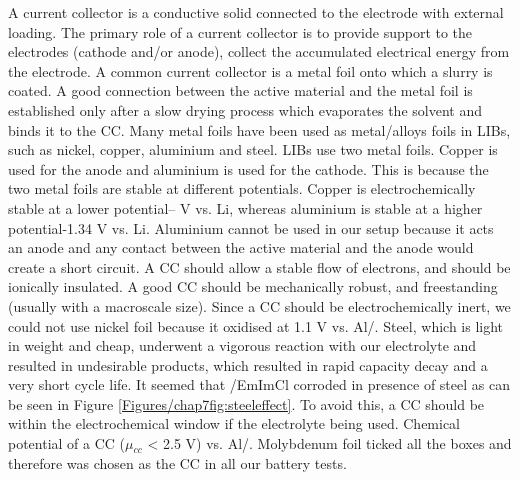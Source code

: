 A current collector is a conductive solid connected to the electrode with external loading. The primary role of a current collector is to provide support to the electrodes (cathode and/or anode), collect the accumulated electrical energy from the electrode. A common current collector is a metal foil onto which a slurry is coated. A good connection between the active material and the metal foil is established only after a slow drying process which evaporates the solvent and binds it to the CC. Many metal foils have been used as metal/alloys foils in LIBs, such as nickel, copper, aluminium and steel. LIBs use two metal foils. Copper is used for the anode and aluminium is used for the cathode. This is because the two metal foils are stable at different potentials. Copper is electrochemically stable at a lower potential--
 V vs. Li, whereas aluminium is stable at a higher potential-1.34 V vs. Li. Aluminium cannot be used in our setup because it acts an anode and any contact between the active material and the anode would create a short circuit.  A CC should allow a stable flow of electrons, and should be ionically insulated. A good CC should be mechanically robust, and freestanding (usually with a macroscale size). Since a CC should be electrochemically inert, we could not use nickel foil because it oxidised at 1.1 V vs. Al/. Steel, which is light in weight and cheap, underwent a vigorous reaction with our electrolyte and resulted in undesirable products, which resulted in rapid capacity decay and a very short cycle life. It seemed that /EmImCl corroded in presence of steel as can be seen in Figure \ref{Figures/chap7fig:steeleffect}. To avoid this, a CC should be within the electrochemical window if the electrolyte being used. Chemical potential of a CC ({$\mu${${_{cc}}$}} < 2.5 V) vs. Al/. Molybdenum foil ticked all the boxes and therefore was chosen as the CC in all our battery tests.  
